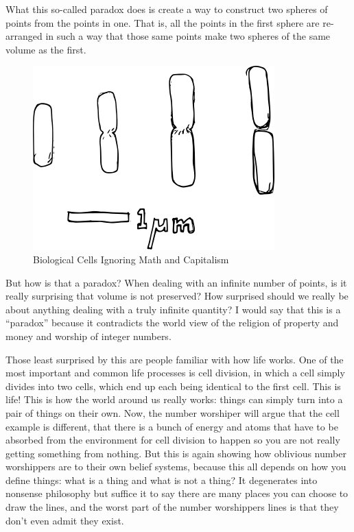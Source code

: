 What this so-called paradox does is create a way to construct two
spheres of points from the points in one. That is, all the points in the
first sphere are re-arranged in such a way that those same points make
two spheres of the same volume as the first.

\begin{figure}[htbp]
\centering
\includegraphics{images/ecoli.png}
\caption{Biological Cells Ignoring Math and Capitalism}
\end{figure}

But how is that a paradox? When dealing with an infinite number of
points, is it really surprising that volume is not preserved? How
surprised should we really be about anything dealing with a truly
infinite quantity? I would say that this is a ``paradox'' because it
contradicts the world view of the religion of property and money and
worship of integer numbers.

Those least surprised by this are people familiar with how life works.
One of the most important and common life processes is cell division, in
which a cell simply divides into two cells, which end up each being
identical to the first cell. This is life! This is how the world around
us really works: things can simply turn into a pair of things on their
own. Now, the number worshiper will argue that the cell example is
different, that there is a bunch of energy and atoms that have to be
absorbed from the environment for cell division to happen so you are not
really getting something from nothing. But this is again showing how
oblivious number worshippers are to their own belief systems, because
this all depends on how you define things: what is a thing and what is
not a thing? It degenerates into nonsense philosophy but suffice it to
say there are many places you can choose to draw the lines, and the
worst part of the number worshippers lines is that they don't even admit
they exist.

